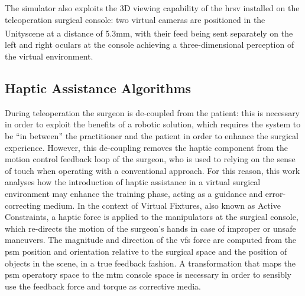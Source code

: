 \documentclass{article}
\newcommand{\cright}{\textsuperscript{\textregistered}\phantom{..}}
\begin{document}
\begin{multicols}{2}
The simulator also exploits the 3D viewing capability of the \ac{hrsv} installed on the teleoperation surgical console: two virtual cameras are positioned in the Unity\cright scene at a distance of 5.3mm, with their feed being sent separately on the left and right oculars at the console achieving a three-dimensional perception of the virtual environment.

\subsection{Haptic Assistance Algorithms}

During teleoperation the surgeon is de-coupled from the patient: this is necessary in order to exploit the benefits of a robotic solution, which requires the system to be ``in between'' the practitioner and the patient in order to enhance the surgical experience. However, this de-coupling removes the haptic component from the motion control feedback loop of the surgeon, who is used to relying on the sense of touch when operating with a conventional approach. For this reason, this work analyses how the introduction of haptic assistance in a virtual surgical environment may enhance the training phase, acting as a guidance and error-correcting medium. 
In the context of Virtual Fixtures, also known as Active Constraints, a haptic force is applied to the manipulators at the surgical console, which re-directs the motion of the surgeon's hands in case of improper or unsafe maneuvers. The magnitude and direction of the \acp{vf} force are computed from the \ac{psm} position and orientation relative to the surgical space and the position of objects in the scene, in a true feedback fashion. A transformation that maps the \ac{psm} operatory space to the \ac{mtm} console space is necessary in order to sensibly use the feedback force and torque as corrective media. 


\end{multicols}
\end{document}
